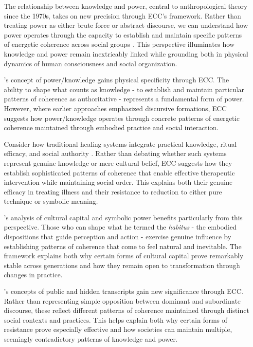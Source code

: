 The relationship between knowledge and power, central to anthropological theory since the 1970s, takes on new precision through ECC's framework. Rather than treating power as either brute force or abstract discourse, we can understand how power operates through the capacity to establish and maintain specific patterns of energetic coherence across social groups \cite{foucault1980power}. This perspective illuminates how knowledge and power remain inextricably linked while grounding both in physical dynamics of human consciousness and social organization.

\cite{foucault1980power}'s concept of power/knowledge gains physical specificity through ECC. The ability to shape what counts as knowledge - to establish and maintain particular patterns of coherence as authoritative - represents a fundamental form of power. However, where earlier approaches emphasized discursive formations, ECC suggests how power/knowledge operates through concrete patterns of energetic coherence maintained through embodied practice and social interaction.

Consider how traditional healing systems integrate practical knowledge, ritual efficacy, and social authority \cite{scott1990domination}. Rather than debating whether such systems represent genuine knowledge or mere cultural belief, ECC suggests how they establish sophisticated patterns of coherence that enable effective therapeutic intervention while maintaining social order. This explains both their genuine efficacy in treating illness and their resistance to reduction to either pure technique or symbolic meaning.

\cite{bourdieu1977outline}'s analysis of cultural capital and symbolic power benefits particularly from this perspective. Those who can shape what he termed the \textit{habitus} - the embodied dispositions that guide perception and action - exercise genuine influence by establishing patterns of coherence that come to feel natural and inevitable. The framework explains both why certain forms of cultural capital prove remarkably stable across generations and how they remain open to transformation through changes in practice.

\cite{scott1990domination}'s concepts of public and hidden transcripts gain new significance through ECC. Rather than representing simple opposition between dominant and subordinate discourse, these reflect different patterns of coherence maintained through distinct social contexts and practices. This helps explain both why certain forms of resistance prove especially effective and how societies can maintain multiple, seemingly contradictory patterns of knowledge and power.

